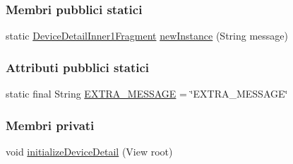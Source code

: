 \subsubsection*{Membri pubblici statici}
\begin{DoxyCompactItemize}
\item 
static \hyperlink{classit_1_1unibo_1_1torsello_1_1bluetoothpositioning_1_1fragment_1_1devicesObservers_1_1DeviceDetailInner1Fragment}{Device\+Detail\+Inner1\+Fragment} \hyperlink{classit_1_1unibo_1_1torsello_1_1bluetoothpositioning_1_1fragment_1_1devicesObservers_1_1DeviceDetailInner1Fragment_ac6fb79b1fec7580e8b96b414bfccd4d6_ac6fb79b1fec7580e8b96b414bfccd4d6}{new\+Instance} (String message)
\end{DoxyCompactItemize}
\subsubsection*{Attributi pubblici statici}
\begin{DoxyCompactItemize}
\item 
static final String \hyperlink{classit_1_1unibo_1_1torsello_1_1bluetoothpositioning_1_1fragment_1_1devicesObservers_1_1DeviceDetailInner1Fragment_a741715e0af61fb59e24b10e035411cbd_a741715e0af61fb59e24b10e035411cbd}{E\+X\+T\+R\+A\+\_\+\+M\+E\+S\+S\+A\+GE} = \char`\"{}E\+X\+T\+R\+A\+\_\+\+M\+E\+S\+S\+A\+GE\char`\"{}
\end{DoxyCompactItemize}
\subsubsection*{Membri privati}
\begin{DoxyCompactItemize}
\item 
void \hyperlink{classit_1_1unibo_1_1torsello_1_1bluetoothpositioning_1_1fragment_1_1devicesObservers_1_1DeviceDetailInner1Fragment_a60ac3d2537a790a04e49c72c3651ff25_a60ac3d2537a790a04e49c72c3651ff25}{initialize\+Device\+Detail} (View root)
\end{DoxyCompactItemize}
